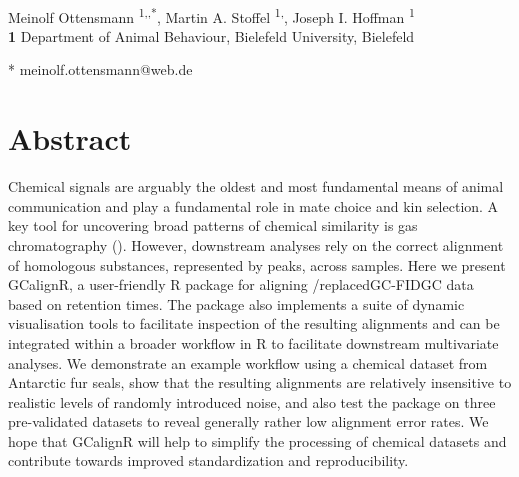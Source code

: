 \documentclass[10pt,letterpaper]{article}
\date{}
\begin{document}
\vspace*{0.2in}
\def\code#1{\texttt{#1}}
\begin{flushleft}
{\Large
\textbf{} 
}
\newline
\\
Meinolf Ottensmann \textsuperscript{1,\added{\Yinyang},*},
Martin A. Stoffel \textsuperscript{1,\added{\Yinyang}},
Joseph I. Hoffman \textsuperscript{1}
\\
\bigskip
\textbf{1} Department of Animal Behaviour, Bielefeld University, Bielefeld
\\
\bigskip


* meinolf.ottensmann@web.de


\end{flushleft}
\section*{Abstract}
Chemical signals are arguably the oldest and most fundamental means of animal communication and play a fundamental role in mate choice and kin selection. A key tool for uncovering broad patterns of chemical similarity is gas chromatography  (). However, downstream analyses rely on the correct alignment of homologous substances, represented by peaks, across samples. Here we present GCalignR, a user-friendly R package for aligning /replaced{GC-FID}{GC} data based on retention times. The package also implements a suite of dynamic visualisation tools to facilitate inspection of the resulting alignments and can be integrated within a broader workflow in R to facilitate downstream multivariate analyses. We demonstrate an example workflow using a chemical dataset from Antarctic fur seals, show that the resulting alignments are relatively insensitive to realistic levels of randomly introduced noise, and also test the package on three pre-validated datasets to reveal generally rather low alignment error rates. We hope that GCalignR will help to simplify the processing of chemical datasets and contribute towards improved standardization and reproducibility.
\linenumbers
\end{document}
